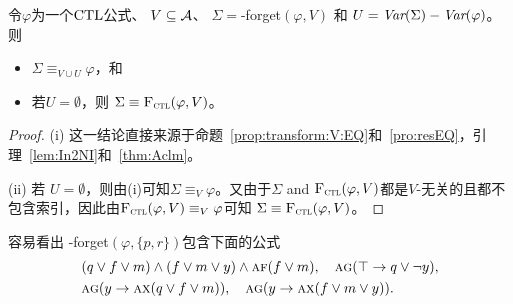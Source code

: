\begin{theorem}\label{thm:soundness:forget:algorithm}
	令$\varphi$为一个$\textrm{CTL}$公式、 $V\subseteq\cal A$、 $\Sigma=$\CTL-forget$(\varphi,V)$  和 $U=\textit{Var}(\Sigma)-\textit{Var}(\varphi)$。则
	\begin{itemize}
		\item[(i)] $\Sigma\equiv_{V\cup U}\varphi$，和
		\item[(ii)] 若$U=\emptyset$，则 $\Sigma\equiv{\textsc{F}_{\textsc{ctl}}}(\varphi,V)$。
	\end{itemize}
\end{theorem}
 	\begin{proof}
 		(i) 这一结论直接来源于命题~\ref{prop:transform:V:EQ}和~\ref{pro:resEQ}，引理~\ref{lem:In2NI}和~\ref{thm:Aclm}。

 		(ii) 若 $U=\emptyset$，则由(i)可知$\Sigma\equiv_{V}\varphi$。又由于$\Sigma$ and ${\textsc{F}_{\textsc{ctl}}}(\varphi,V)$都是$V$-无关的且都不包含索引，因此由${\textsc{F}_{\textsc{ctl}}}(\varphi,V) \equiv_V \varphi$可知 $\Sigma\equiv{\textsc{F}_{\textsc{ctl}}}(\varphi,V)$。
 	\end{proof}


\begin{example}\label{examp:forget:algorithm}
	容易看出 \CTL-forget$(\varphi,\{p,r\})$包含下面的公式
	\begin{align*}%
		&  (q \vee f \vee m)\land (f \vee m \vee y)\land\ALL \FUTURE (f \vee m), \quad \ALL\GLOBAL ( \top \rto q\vee\neg y),  \\
		&  \ALL\GLOBAL(y \rto \ALL\NEXT(q \vee f\vee m)), \quad \ALL\GLOBAL( y \rto \ALL\NEXT(f\vee m\vee y)).
	\end{align*}
\end{example}


